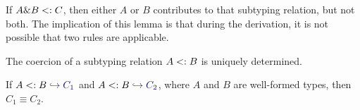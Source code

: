 If $A \& B <: C$, then either $A$ or $B$ contributes to that subtyping
relation, but not both. The implication of this lemma is that during the
derivation, it is not possible that two rules are applicable.

\newcommand{\wfinterlabel}{\textsc{WFInter}}


The coercion of a subtyping relation $A <: B$ is uniquely determined.

\begin{lemma} \label{unique-coercion}

  If $A \subtype B \yields {C_1}$ and $A \subtype B \yields {C_2}$, where $A$
  and $B$ are well-formed types, then $C_1 \equiv C_2$.

\end{lemma}

%
%

